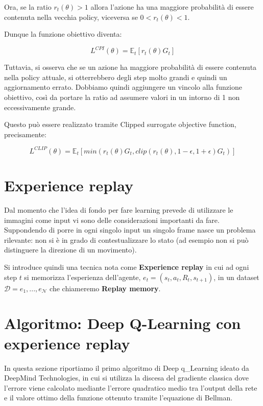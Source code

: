 \documentclass[a4paper,11pt,twoside]{report} %
\begin{document}
Ora, se la ratio $r_{t}(\theta)>1$ allora l'azione ha una maggiore probabilità di essere contenuta nella vecchia policy, viceversa se $0<r_{t}(\theta)<1$.

Dunque la funzione obiettivo diventa:

\begin{equation}
L^{CPI}(\theta) = \mathbb{E}_{t}[r_{t}(\theta)G_{t}]
\end{equation}

Tuttavia, si osserva che se un azione ha maggiore probabilità di essere contenuta nella policy attuale, si otterrebbero degli step molto grandi e quindi un aggiornamento errato. Dobbiamo quindi aggiungere un vincolo alla funzione obiettivo, così da portare la ratio ad assumere valori in un intorno di 1 non eccessivamente grande.

Questo può essere realizzato tramite Clipped surrogate objective function, precisamente:

\begin{equation}
L^{CLIP}(\theta) = \mathbb{E}_{t}[min(r_{t}(\theta)G_{t}, clip(r_t(\theta),1-\epsilon,1+\epsilon)G_{t})]
\end{equation}



\section{Experience replay}

Dal momento che l'idea di fondo per fare learning prevede di utilizzare le immagini come input vi sono delle considerazioni importanti da fare. Suppondendo di porre in ogni singolo input un singolo frame nasce un problema rilevante: non si è in grado di contestualizzare lo stato (ad esempio non si può distinguere la direzione di un movimento).

Si introduce quindi una tecnica nota come \textbf{Experience replay} in cui ad ogni step $t$ si memorizza l'esperienza dell'agente, $e_{t} = (s_{t}, a_{t},R_{t},s_{t+1})$, in un dataset $\mathcal{D}=e_{1},...,e_{\mathcal{N}}$ che chiameremo \textbf{Replay memory}. 


\section{Algoritmo: Deep Q-Learning con experience replay}

In questa sezione riportiamo il primo algoritmo di Deep q_Learning ideato da DeepMind Technologies, in cui si utilizza la discesa del gradiente classica dove l'errore viene calcolato mediante l'errore quadratico medio tra l'output della rete e il valore ottimo della funzione ottenuto tramite l'equazione di Bellman.
 
\end{document}
